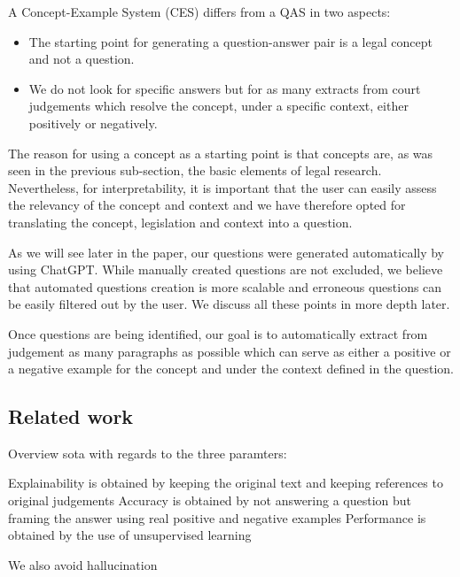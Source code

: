 A Concept-Example System (CES) differs from a QAS in two aspects:

\begin{itemize}
 \item The starting point for generating a question-answer pair is a legal concept and not a question.
 \item We do not look for specific answers but for as many extracts from court judgements which resolve the concept, under a specific context, either positively or negatively.
\end{itemize}

The reason for using a concept as a starting point is that concepts are, as was seen in the previous sub-section, the basic elements of legal research. Nevertheless, for interpretability, it is important that the user can easily assess the relevancy of the concept and context and we have therefore opted for translating the concept, legislation and context into a question.

As we will see later in the paper, our questions were generated automatically by using ChatGPT. While manually created questions are not excluded, we believe that automated questions creation is more scalable and erroneous questions can be easily filtered out by the user. We discuss all these points in more depth later.

Once questions are being identified, our goal is to automatically extract from judgement as many paragraphs as possible which can serve as either a positive or a negative example for the concept and under the context defined in the question.

\subsection{Related work}

Overview sota with regards to the three paramters:

Explainability is obtained by keeping the original text and keeping references to original judgements
Accuracy is obtained by not answering a question but framing the answer using real positive and negative examples
Performance is obtained by the use of unsupervised learning

We also avoid hallucination